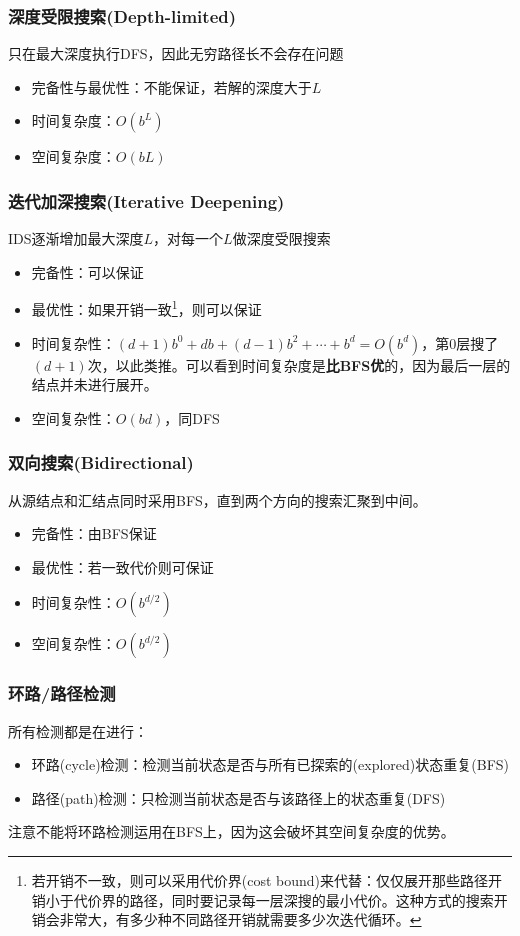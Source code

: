 \subsubsection{深度受限搜索(Depth-limited)}
只在最大深度执行DFS，因此无穷路径长不会存在问题
\begin{itemize}
	\item 完备性与最优性：不能保证，若解的深度大于$L$
	\item 时间复杂度：$O(b^L)$
	\item 空间复杂度：$O(bL)$
\end{itemize}

\subsubsection{迭代加深搜索(Iterative Deepening)}
IDS逐渐增加最大深度$L$，对每一个$L$做深度受限搜索
\begin{itemize}
	\item 完备性：可以保证
	\item 最优性：如果开销一致\footnote{若开销不一致，则可以采用代价界(cost bound)来代替：仅仅展开那些路径开销小于代价界的路径，同时要记录每一层深搜的最小代价。这种方式的搜索开销会非常大，有多少种不同路径开销就需要多少次迭代循环。}，则可以保证
	\item 时间复杂性：$(d+1)b^0+db+(d-1)b^2+\cdots+b^d=O(b^d)$，第$0$层搜了$(d+1)$次，以此类推。可以看到时间复杂度是\textbf{比BFS优}的，因为最后一层的结点并未进行展开。
	\item 空间复杂性：$O(bd)$，同DFS
\end{itemize}

\subsubsection{双向搜索(Bidirectional)}
从源结点和汇结点同时采用BFS，直到两个方向的搜索汇聚到中间。
\begin{itemize}
	\item 完备性：由BFS保证
	\item 最优性：若一致代价则可保证
	\item 时间复杂性：$O(b^{d/2})$
	\item 空间复杂性：$O(b^{d/2})$
\end{itemize}

\subsubsection{环路/路径检测}
所有检测都是在进行：
\begin{itemize}
	\item 环路(cycle)检测：检测当前状态是否与所有已探索的(explored)状态重复(BFS)
	\item 路径(path)检测：只检测当前状态是否与该路径上的状态重复(DFS)
\end{itemize}
注意不能将环路检测运用在BFS上，因为这会破坏其空间复杂度的优势。

